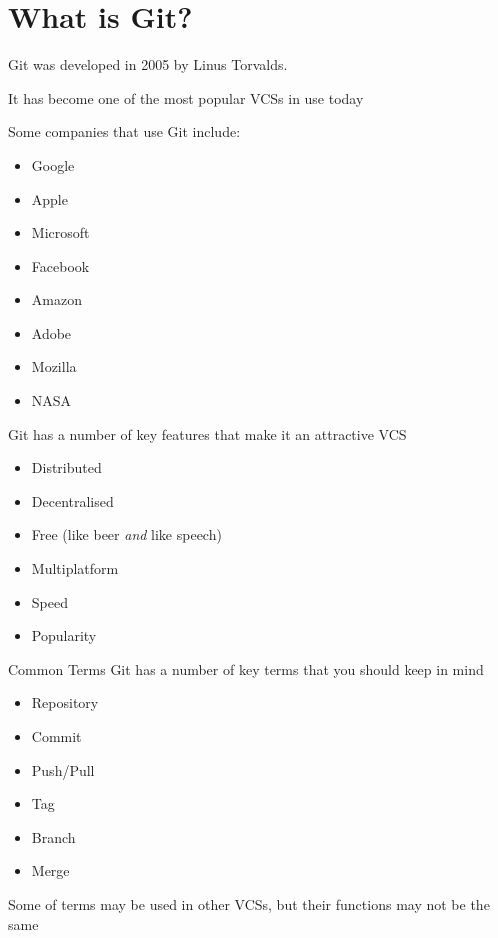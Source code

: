 \documentclass{beamer}
\begin{document}
\section{What is Git?}
\begin{frame}[allowframebreaks]{\secname}
    Git was developed in 2005 by Linus Torvalds.

    It has become one of the most popular VCSs in use today

    Some companies that use Git include:
    \begin{itemize}
        \item Google
        \item Apple
        \item Microsoft
        \item Facebook
        \item Amazon
        \item Adobe
        \item Mozilla
        \item NASA
    \end{itemize}

\framebreak
    
    Git has a number of key features that make it an attractive VCS
    \begin{itemize}
        \item Distributed
        \item Decentralised
        \item Free (like beer {\it and} like speech)
        \item Multiplatform
        \item Speed
        \item Popularity
    \end{itemize}
\end{frame}

\begin{frame}{Common Terms}
    Git has a number of key terms that you should keep in mind
    \begin{itemize}
        \item Repository 
        \item Commit
        \item Push/Pull
        \item Tag
        \item Branch
        \item Merge
    \end{itemize}
    Some of terms may be used in other VCSs, but their functions may not be
    the same
\end{frame}
\end{document}
